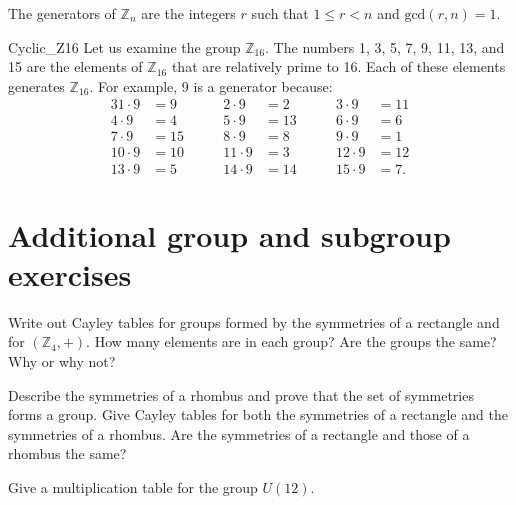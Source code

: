  
\begin{corollary}
The generators of ${\mathbb Z}_n$ are the integers $r$ such that $1 \leq
r < n$ and $\text{gcd}(r,n) =  1$. 
\end{corollary}
 
 
\begin{example}{Cyclic_Z16}
Let us examine the group ${\mathbb Z}_{16}$.  The numbers 1, 3, 5, 7, 9,
11, 13, and 15 are the elements of ${\mathbb Z}_{16}$ that are relatively
prime to 16.  Each of these elements generates ${\mathbb Z}_{16}$. For
example, 9 is a generator because:
\begin{alignat*}{3}
1 \cdot 9  & =  9  & \qquad 2 \cdot 9  & = 2  & \qquad 3 \cdot 9  & = 11 \\
4 \cdot 9  & =  4  & \qquad 5 \cdot 9  & = 13 & \qquad	6 \cdot 9 & = 6  \\
7 \cdot 9  & =  15 & \qquad 8 \cdot 9  & = 8  & \qquad	9 \cdot 9 &  = 1  \\
10 \cdot 9 & =  10 & \qquad 11 \cdot 9 & = 3  & \qquad	12 \cdot 9 &  = 12 \\
13 \cdot 9 & =  5 &  \qquad 14 \cdot 9 & = 14 &  \qquad	15 \cdot 9 & = 7.
\end{alignat*}
\end{example}



\section{Additional group and subgroup exercises}\label{sec:addGpEx}


\begin{exercise}{} 
Write out Cayley tables for groups formed by the symmetries of a
rectangle and for $({\mathbb Z}_4, +)$. How many elements are in each
group? Are the groups the same? Why or why not? 
\end{exercise} 
 
\begin{exercise}{} 
Describe the symmetries of a rhombus and prove that the set of
symmetries forms a group. Give Cayley tables for both the symmetries
of a rectangle and the symmetries of a rhombus. Are the symmetries of
a rectangle and those of a rhombus the same?
\end{exercise} 
 
\begin{exercise}{} 
Give a multiplication table for the group $U(12)$.
\end{exercise} 
 
